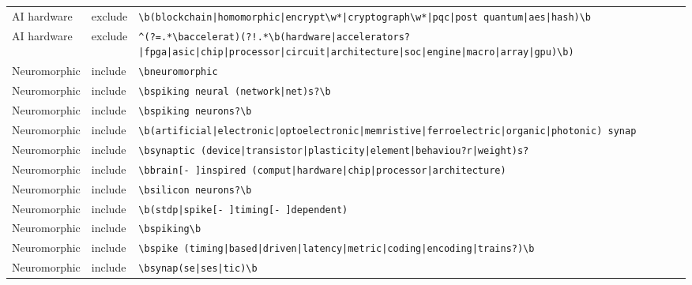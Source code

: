 \documentclass[10pt]{article}
\begin{document}
\begin{longtable}{@{}lL{1.6cm}L{11.5cm}@{}}
AI hardware & exclude & \texttt{\textbackslash{}b\allowbreak(blockchain\allowbreak|homomorphic\allowbreak|encrypt\textbackslash{}w*\allowbreak|cryptograph\textbackslash{}w*\allowbreak|pqc\allowbreak|post quantum\allowbreak|aes\allowbreak|hash)\textbackslash{}b} \\
AI hardware & exclude & \texttt{\textasciicircum{}\allowbreak(?=.*\textbackslash{}baccelerat)\allowbreak(?!.*\textbackslash{}b\allowbreak(hardware\allowbreak|accelerators?\allowbreak|fpga\allowbreak|asic\allowbreak|chip\allowbreak|processor\allowbreak|circuit\allowbreak|architecture\allowbreak|soc\allowbreak|engine\allowbreak|macro\allowbreak|array\allowbreak|gpu)\textbackslash{}b)} \\
Neuromorphic & include & \texttt{\textbackslash{}bneuromorphic} \\
Neuromorphic & include & \texttt{\textbackslash{}bspiking neural \allowbreak(network\allowbreak|net)s?\textbackslash{}b} \\
Neuromorphic & include & \texttt{\textbackslash{}bspiking neurons?\textbackslash{}b} \\
Neuromorphic & include & \texttt{\textbackslash{}b\allowbreak(artificial\allowbreak|electronic\allowbreak|optoelectronic\allowbreak|memristive\allowbreak|ferroelectric\allowbreak|organic\allowbreak|photonic) synap} \\
Neuromorphic & include & \texttt{\textbackslash{}bsynaptic \allowbreak(device\allowbreak|transistor\allowbreak|plasticity\allowbreak|element\allowbreak|behaviou?r\allowbreak|weight)s?} \\
Neuromorphic & include & \texttt{\textbackslash{}bbrain[- ]inspired \allowbreak(comput\allowbreak|hardware\allowbreak|chip\allowbreak|processor\allowbreak|architecture)} \\
Neuromorphic & include & \texttt{\textbackslash{}bsilicon neurons?\textbackslash{}b} \\
Neuromorphic & include & \texttt{\textbackslash{}b\allowbreak(stdp\allowbreak|spike[- ]timing[- ]dependent)} \\
Neuromorphic & include & \texttt{\textbackslash{}bspiking\textbackslash{}b} \\
Neuromorphic & include & \texttt{\textbackslash{}bspike \allowbreak(timing\allowbreak|based\allowbreak|driven\allowbreak|latency\allowbreak|metric\allowbreak|coding\allowbreak|encoding\allowbreak|trains?)\textbackslash{}b} \\
Neuromorphic & include & \texttt{\textbackslash{}bsynap\allowbreak(se\allowbreak|ses\allowbreak|tic)\textbackslash{}b} \\

\end{longtable}
\end{document}
